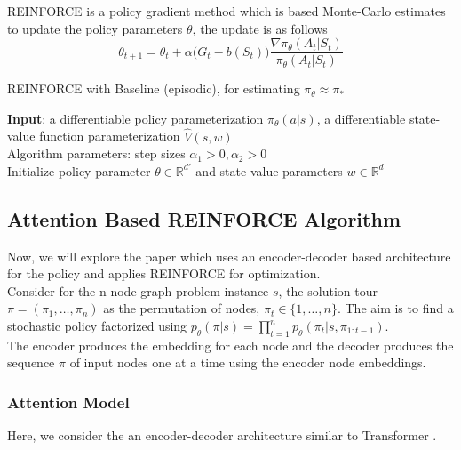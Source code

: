 \documentclass{article}
\theoremstyle{definition}
\begin{document}
REINFORCE is a policy gradient method which is based Monte-Carlo estimates to update the policy parameters $\theta$, the update is as follows
\[\theta_{t+1}=\theta_t+\alpha \Big(G_t-b(S_t)\Big)\dfrac{\nabla \pi_\theta(A_t|S_t)}{\pi_\theta(A_t|S_t)}\]
\begin{algorithm}[H]
\SetAlgoLined
\caption{REINFORCE with Baseline (episodic), for estimating $\pi_\theta\approx\pi_*$}
\textbf{Input}: a differentiable policy parameterization $\pi_\theta(a|s)$, a differentiable state-value function parameterization $\hat{V}(s,w)$\\
Algorithm parameters: step sizes $\alpha_1 > 0, \alpha_2 > 0$\\
Initialize policy parameter $\theta\in\mathbb{R}^{d'}$ and state-value parameters $w\in\mathbb{R}^d$\\
\end{algorithm}

\subsection{Attention Based REINFORCE Algorithm}
Now, we will explore the paper \cite{attention} which uses an encoder-decoder based architecture for the policy and applies REINFORCE for optimization.\\

Consider for the n-node graph problem instance $s$, the solution tour $\pi = (\pi_1,\ldots,\pi_n)$ as the permutation of nodes, $\pi_t\in\{1,\ldots,n\}$. The aim is to find a stochastic policy factorized using $p_\theta(\pi|s)=\prod_{t=1}^n p_\theta(\pi_t|s,\pi_{1:t-1})$.\\

The encoder produces the embedding for each node and the decoder produces the sequence $\pi$ of input nodes one at a time using the encoder node embeddings.
\subsubsection{Attention Model}
Here, we consider the an encoder-decoder architecture similar to Transformer \cite{https://doi.org/10.48550/arxiv.1706.03762}.\\
\end{document}
